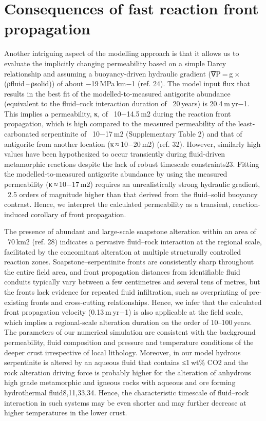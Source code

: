 \section*{Consequences of fast reaction front propagation}
Another intriguing aspect of the modelling approach is that it allows us to evaluate the implicitly changing permeability based on a simple Darcy relationship and assuming a buoyancy-driven hydraulic gradient (∇P = g × (ρfluid – ρsolid)) of about −19 MPa km−1 (ref. 24). The model input flux that results in the best fit of the modelled-to-measured antigorite abundance (equivalent to the fluid–rock interaction duration of ~20 years) is 20.4 m yr−1. This implies a permeability, κ, of ~10−14.5 m2 during the reaction front propagation, which is high compared to the measured permeability of the least-carbonated serpentinite of ~10−17 m2 (Supplementary Table 2) and that of antigorite from another location (κ ≈ 10−20 m2) (ref. 32). However, similarly high values have been hypothesized to occur transiently during fluid-driven metamorphic reactions despite the lack of robust timescale constraints23. Fitting the modelled-to-measured antigorite abundance by using the measured permeability (κ ≈ 10−17 m2) requires an unrealistically strong hydraulic gradient, ~2.5 orders of magnitude higher than that derived from the fluid–solid buoyancy contrast. Hence, we interpret the calculated permeability as a transient, reaction-induced corollary of front propagation.

The presence of abundant and large-scale soapstone alteration within an area of ~70 km2 (ref. 28) indicates a pervasive fluid–rock interaction at the regional scale, facilitated by the concomitant alteration at multiple structurally controlled reaction zones. Soapstone–serpentinite fronts are consistently sharp throughout the entire field area, and front propagation distances from identifiable fluid conduits typically vary between a few centimetres and several tens of metres, but the fronts lack evidence for repeated fluid infiltration, such as overprinting of pre-existing fronts and cross-cutting relationships. Hence, we infer that the calculated front propagation velocity (0.13 m yr−1) is also applicable at the field scale, which implies a regional-scale alteration duration on the order of 10–100 years. The parameters of our numerical simulation are consistent with the background permeability, fluid composition and pressure and temperature conditions of the deeper crust irrespective of local lithology. Moreover, in our model hydrous serpentinite is altered by an aqueous fluid that contains ≤1 wt\% CO2 and the rock alteration driving force is probably higher for the alteration of anhydrous high grade metamorphic and igneous rocks with aqueous and ore forming hydrothermal fluid8,11,33,34. Hence, the characteristic timescale of fluid–rock interaction in such systems may be even shorter and may further decrease at higher temperatures in the lower crust.

